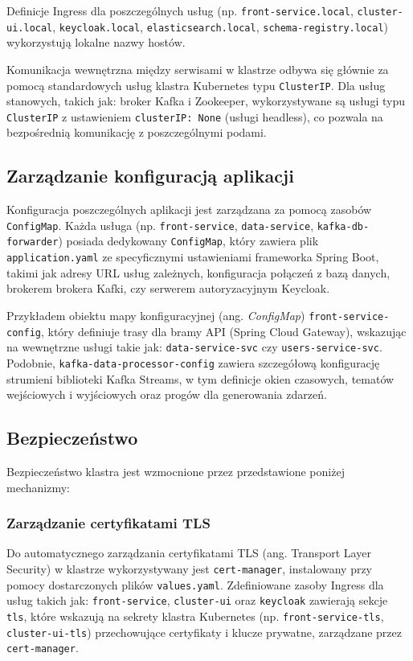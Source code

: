Definicje Ingress dla poszczególnych usług (np. \texttt{front-service.local}, \texttt{cluster-ui.local}, \texttt{keycloak.local}, \texttt{elasticsearch.local}, \texttt{schema-registry.local}) wykorzystują lokalne nazwy hostów.

Komunikacja wewnętrzna między serwisami w klastrze odbywa się głównie za pomocą standardowych usług klastra Kubernetes typu \texttt{ClusterIP}. Dla usług stanowych, takich jak: broker Kafka i Zookeeper, wykorzystywane są usługi typu \texttt{ClusterIP} z ustawieniem \texttt{clusterIP: None} (usługi headless), co pozwala na bezpośrednią komunikację z poszczególnymi podami.

\subsection{Zarządzanie konfiguracją aplikacji} 

Konfiguracja poszczególnych aplikacji jest zarządzana za pomocą zasobów \texttt{ConfigMap}. Każda usługa (np. \texttt{front-service}, \texttt{data-service}, \texttt{kafka-db-forwarder}) posiada dedykowany \texttt{ConfigMap}, który zawiera plik \texttt{application.yaml} ze specyficznymi ustawieniami frameworka Spring Boot, takimi jak adresy URL usług zależnych, konfiguracja połączeń z bazą danych, brokerem brokera Kafki, czy serwerem autoryzacyjnym Keycloak.

Przykładem obiektu mapy konfiguracyjnej (ang. \textit{ConfigMap}) \texttt{front-service-config}, który definiuje trasy dla bramy API (Spring Cloud Gateway), wskazując na wewnętrzne usługi takie jak: \texttt{data-service-svc} czy \texttt{users-service-svc}. Podobnie, \texttt{kafka-data-processor-config} zawiera szczegółową konfigurację strumieni biblioteki Kafka Streams, w tym definicje okien czasowych, tematów wejściowych i wyjściowych oraz progów dla generowania zdarzeń.

\subsection{Bezpieczeństwo}

Bezpieczeństwo klastra jest wzmocnione przez przedstawione poniżej mechanizmy:

\subsubsection{Zarządzanie certyfikatami TLS}
Do automatycznego zarządzania certyfikatami TLS (ang. Transport Layer Security) w klastrze wykorzystywany jest \texttt{cert-manager}, instalowany przy pomocy dostarczonych plików \texttt{values.yaml}. Zdefiniowane zasoby Ingress dla usług takich jak: \texttt{front-service}, \texttt{cluster-ui} oraz \texttt{keycloak} zawierają sekcje \texttt{tls}, które wskazują na sekrety klastra Kubernetes (np. \texttt{front-service-tls}, \texttt{cluster-ui-tls}) przechowujące certyfikaty i klucze prywatne, zarządzane przez \texttt{cert-manager}.

